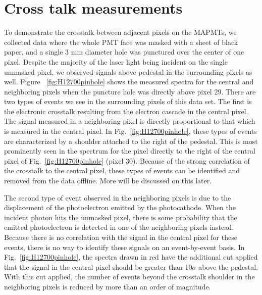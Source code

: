 \section{Cross talk measurements}

To demonstrate the crosstalk between adjacent pixels on the MAPMTs, we collected data where the whole PMT face was masked with a sheet of black paper, and a single 3 mm diameter hole was punctured over the center of one pixel. Despite the majority of the laser light being incident on the single unmasked pixel, we observed signals above pedestal in the surrounding pixels as well. Figure ~\ref{fig:H12700pinhole} shows the measured spectra for the central and neighboring pixels when the puncture hole was directly above pixel 29. There are two types of events we see in the surrounding pixels of this data set. The first is the electronic crosstalk resulting from the electron cascade in the central pixel. The signal measured in a neighboring pixel is directly proportional to that which is measured in the central pixel. In Fig.~\ref{fig:H12700pinhole}, these types of events are characterized by a shoulder attached to the right of the pedestal. This is most prominently seen in the spectrum for the pixel directly to the right of the central pixel of Fig.~\ref{fig:H12700pinhole} (pixel 30). Because of the strong correlation of the crosstalk to the central pixel, these types of events can be identified and removed from the data offline. More will be discussed on this later.

The second type of event observed in the neighboring pixels is due to the displacement of the photoelectron emitted by the photocathode. When the incident photon hits the unmasked pixel, there is some probability that the emitted photoelectron is detected in one of the neighboring pixels instead. Because there is no correlation with the signal in the central pixel for these events, there is no way to identify these signals on an event-by-event basis. In Fig.~\ref{fig:H12700pinhole}, the spectra drawn in red have the additional cut applied that the signal in the central pixel should be greater than 10$\sigma$ above the pedestal. With this cut applied, the number of events beyond the crosstalk shoulder in the neighboring pixels is reduced by more than an order of magnitude.


